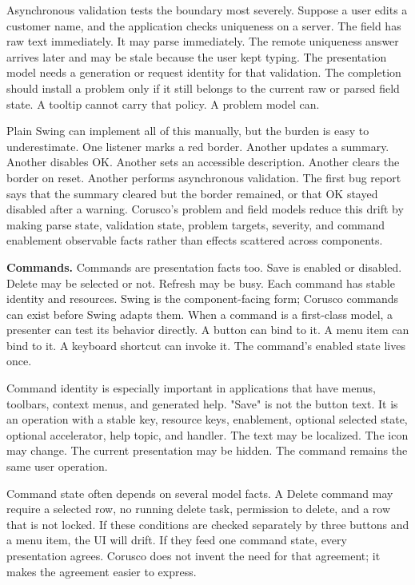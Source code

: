 Asynchronous validation tests the boundary most severely. Suppose a user edits a customer name, and the application checks uniqueness on a server. The field has raw text immediately. It may parse immediately. The remote uniqueness answer arrives later and may be stale because the user kept typing. The presentation model needs a generation or request identity for that validation. The completion should install a problem only if it still belongs to the current raw or parsed field state. A tooltip cannot carry that policy. A problem model can.

Plain Swing can implement all of this manually, but the burden is easy to underestimate. One listener marks a red border. Another updates a summary. Another disables OK. Another sets an accessible description. Another clears the border on reset. Another performs asynchronous validation. The first bug report says that the summary cleared but the border remained, or that OK stayed disabled after a warning. Corusco's problem and field models reduce this drift by making parse state, validation state, problem targets, severity, and command enablement observable facts rather than effects scattered across components.

\textbf{Commands.} Commands are presentation facts too. Save is enabled or disabled. Delete may be selected or not. Refresh may be busy. Each command has stable identity and resources. Swing  is the component-facing form; Corusco commands can exist before Swing adapts them. When a command is a first-class model, a presenter can test its behavior directly. A button can bind to it. A menu item can bind to it. A keyboard shortcut can invoke it. The command's enabled state lives once.

Command identity is especially important in applications that have menus, toolbars, context menus, and generated help. "Save" is not the button text. It is an operation with a stable key, resource keys, enablement, optional selected state, optional accelerator, help topic, and handler. The text may be localized. The icon may change. The current presentation may be hidden. The command remains the same user operation.

Command state often depends on several model facts. A Delete command may require a selected row, no running delete task, permission to delete, and a row that is not locked. If these conditions are checked separately by three buttons and a menu item, the UI will drift. If they feed one command state, every presentation agrees. Corusco does not invent the need for that agreement; it makes the agreement easier to express.

